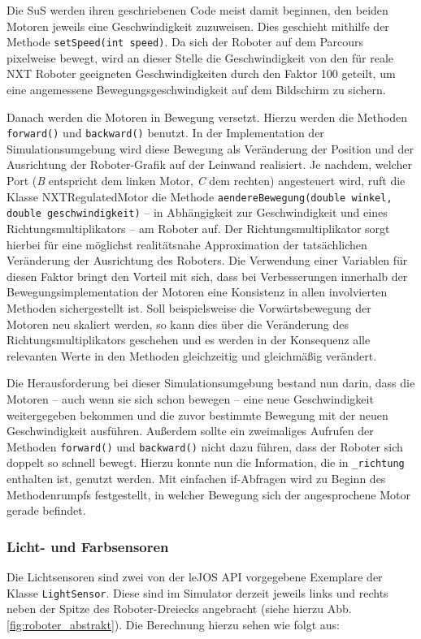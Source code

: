 \documentclass[paper=a4, DIV=calc, BCOR=12mm, twoside=on, onecolumn=on, open = right, titlepage =on, parskip =half-, headsepline = on, footsepline = off, chapterprefix = off, appendixprefix = on, fontsize = 12pt, numbers = noenddot, abstract = on]{scrbook}
\begin{document}
Die SuS werden ihren geschriebenen Code meist damit beginnen, den beiden Motoren jeweils eine Geschwindigkeit zuzuweisen. Dies geschieht mithilfe der Methode \texttt{setSpeed(int speed)}. Da sich der Roboter auf dem Parcours pixelweise bewegt, wird an dieser Stelle die Geschwindigkeit von den für reale NXT Roboter geeigneten Geschwindigkeiten durch den Faktor 100 geteilt, um eine angemessene Bewegungsgeschwindigkeit auf dem Bildschirm zu sichern.

Danach werden die Motoren in Bewegung versetzt. Hierzu werden die Methoden \texttt{forward()} und \texttt{backward()} benutzt. In der Implementation der Simulationsumgebung wird diese Bewegung als Veränderung der Position und der Ausrichtung der Roboter-Grafik auf der Leinwand realisiert. Je nachdem, welcher Port (\emph{B} entspricht dem linken Motor, \emph{C} dem rechten) angesteuert wird, ruft die Klasse NXTRegulatedMotor die Methode \texttt{aendereBewegung(double winkel, double geschwindigkeit)} -- in Abhängigkeit zur Geschwindigkeit und eines Richtungsmultiplikators -- am Roboter auf. Der Richtungsmultiplikator sorgt hierbei für eine möglichst realitätsnahe Approximation der tatsächlichen Veränderung der Ausrichtung des Roboters. Die Verwendung einer Variablen für diesen Faktor bringt den Vorteil mit sich, dass bei Verbesserungen innerhalb der Bewegungsimplementation der Motoren eine Konsistenz in allen involvierten Methoden sichergestellt ist. Soll beispielsweise die Vorwärtsbewegung der Motoren neu skaliert werden, so kann dies über die Veränderung des Richtungsmultiplikators geschehen und es werden in der Konsequenz alle relevanten Werte in den Methoden gleichzeitig und gleichmäßig verändert. 

Die Herausforderung bei dieser Simulationsumgebung bestand nun darin, dass die Motoren -- auch wenn sie sich schon bewegen -- eine neue Geschwindigkeit weitergegeben bekommen und die zuvor bestimmte Bewegung mit der neuen Geschwindigkeit ausführen. Außerdem sollte ein zweimaliges Aufrufen der Methoden \texttt{forward()} und \texttt{backward()} nicht dazu führen, dass der Roboter sich doppelt so schnell bewegt. Hierzu konnte nun die Information, die in  \texttt{{\_}richtung} enthalten ist, genutzt werden. Mit einfachen if-Abfragen wird zu Beginn des Methodenrumpfs festgestellt, in welcher Bewegung sich der angesprochene Motor gerade befindet. 


\subsubsection{Licht- und Farbsensoren}
Die Lichtsensoren sind zwei von der leJOS API vorgegebene Exemplare der Klasse \texttt{LightSensor}. Diese sind im Simulator derzeit jeweils links und rechts neben der Spitze des Roboter-Dreiecks angebracht (siehe hierzu Abb. \ref{fig:roboter_abstrakt}). Die Berechnung hierzu sehen wie folgt aus:
\end{document}
